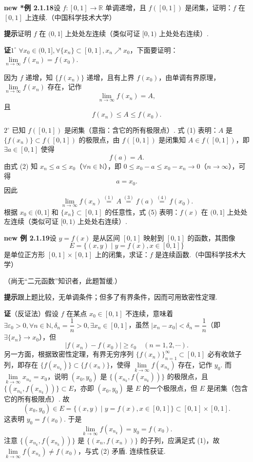 \documentclass[UTF8,12pt,a4paper,fontset=fandol]{ctexart}
\begin{document}
\noindent\textbf{new *例 2.1.18}\quad 设 $f:[0,1]\to\mathbb{R}$ 单调递增，且 $f([0,1])$ 是闭集，证明：$f$ 在 $[0,1]$ 上连续.（中国科学技术大学）

\noindent\textbf{提示}\quad 证明 $f$ 在 $(0,1]$ 上处处左连续（类似可证 $[0,1)$ 上处处右连续）.

\noindent\textbf{证}\quad $1^\circ$ $\forall x_0\in(0,1],\forall\{x_n\}\subset[0,1],x_n\nearrow x_0$，下面要证明：$\lim\limits_{n\to\infty}f(x_n)=f(x_0)$.

因为 $f$ 递增，知 $\{f(x_n)\}$ 递增，且有上界 $f(x_0)$，由单调有界原理，$\lim\limits_{n\to\infty}f(x_n)$ 存在，记作
\[
  \lim_{n\to\infty}f(x_n)=A,
\tag{1}
\]
且
\[
  f(x_n)\le A\le f(x_0).
\tag{2}
\]

$2^\circ$ 已知 $f([0,1])$ 是闭集（意指：含它的所有极限点）. 式 (1) 表明：$A$ 是 $\{f(x_n)\}\subset f([0,1])$ 的极限点，由 $f([0,1])$ 是闭集知 $A\in f([0,1])$，即 $\exists a\in[0,1]$ 使得
\[
  f(a)=A.
\tag{3}
\]
由式 (2) 知 $x_n\le a\le x_0$（$\forall n\in\mathbb{N}$），即 $0\le x_0-a\le x_0-x_n\to0$（$n\to\infty$），可得
\[
  a=x_0.
\tag{4}
\]
因此
\[
  \lim_{n\to\infty}f(x_n)\overset{(1)}=A\overset{(3)}=f(a)\overset{(4)}=f(x_0).
\tag{5}
\]
根据 $x_0\in(0,1]$ 和 $\{x_n\}\subset[0,1]$ 的任意性，式 (5) 表明：$f(x)$ 在 $(0,1]$ 上处处左连续（类似可证 $[0,1)$ 上处处右连续）.

\noindent\textbf{new 例 2.1.19}\quad 设 $y=f(x)$ 是从区间 $[0,1]$ 映射到 $[0,1]$ 的函数，其图像
\[
  E=\{(x,y)\mid y=f(x),x\in[0,1]\}
\]
是单位正方形 $[0,1]\times[0,1]$ 上的闭集，求证：$f$ 是连续函数.（中国科学技术大学）

（尚无“二元函数”知识者，此题暂缓.）

\noindent\textbf{提示}\quad 跟上题比较，无单调条件；但多了有界条件，因而可用致密性定理.

\noindent\textbf{证}\quad （反证法）假设 $f$ 在某点 $x_0\in[0,1]$ 不连续，意味着 $\exists\varepsilon_0>0,\forall n\in\mathbb{N},\delta_n=\dfrac1n>0,\exists x_n\in[0,1]$，虽然 $|x_n-x_0|<\delta_n=\dfrac1n$（即 $\exists\{x_n\}\to x_0$），但
\[
  |f(x_n)-f(x_0)|\ge\varepsilon_0\quad(n=1,2,\cdots).
\tag{1}
\]
另一方面，根据致密性定理，有界无穷序列 $\{f(x_n)\}_{n=1}^{\infty}\subset[0,1]$ 必有收敛子列，即存在 $\{f(x_{n_k})\}\subset\{f(x_n)\}$，使得 $\lim\limits_{k\to\infty}f(x_{n_k})$ 存在，记作 $y_0$. 而 $\lim\limits_{k\to\infty}x_{n_k}=x_0$，说明 $(x_0,y_0)$ 是 $\{(x_{n_k},f(x_{n_k}))\}$ 的极限点，且 $\{(x_{n_k},f(x_{n_k}))\}\subset E$，亦即 $(x_0,y_0)$ 是 $E$ 的一个极限点，但 $E$ 是闭集（包含它的所有极限点）. 故
\[
  (x_0,y_0)\in E=\{(x,y)\mid y=f(x),x\in[0,1]\}\subset[0,1]\times[0,1].
\]
这表明 $y_0=f(x_0)$. 于是
\[
  \lim_{k\to\infty}f(x_{n_k})=y_0=f(x_0).
\tag{2}
\]
注意 $\{(x_{n_k},f(x_{n_k}))\}$ 是 $\{(x_n,f(x_n))\}$ 的子列，应满足式 (1)，故 $\lim\limits_{k\to\infty}f(x_{n_k})\ne f(x_0)$，与式 (2) 矛盾. 连续性获证.
\end{document}

